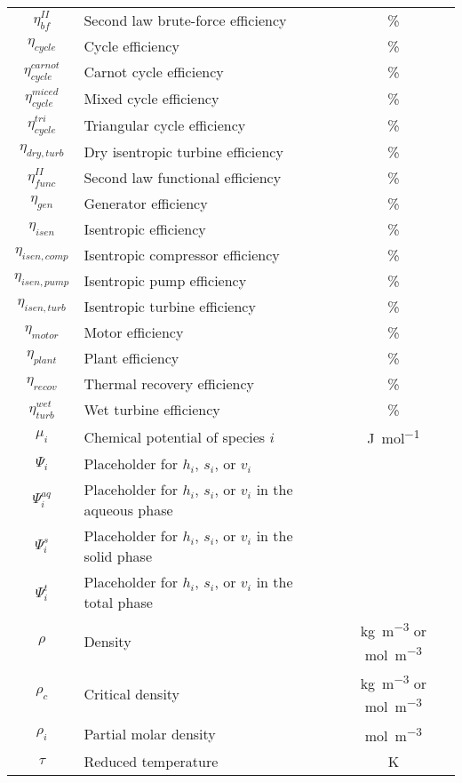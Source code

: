 \begin{longtable}{  c|p{10cm}|c}
        $\eta_{bf}^{II}$ & Second law brute-force efficiency & \unit{\percent} \\[2px]
        $\eta_{cycle}$ & Cycle efficiency & \unit{\percent} \\[2px]
        $\eta_{cycle}^{carnot}$ & Carnot cycle efficiency & \unit{\percent} \\[2px]
        $\eta_{cycle}^{miced}$ & Mixed cycle efficiency & \unit{\percent} \\[2px]
        $\eta_{cycle}^{tri}$ & Triangular cycle efficiency & \unit{\percent} \\[2px]
        $\eta_{dry,turb}$ & Dry isentropic turbine efficiency & \unit{\percent} \\[2px]
        $\eta_{func}^{II}$ & Second law functional efficiency & \unit{\percent} \\[2px]
        $\eta_{gen}$ & Generator efficiency & \unit{\percent} \\[2px]
        $\eta_{isen}$ & Isentropic efficiency & \unit{\percent} \\[2px]
        $\eta_{isen, comp}$ & Isentropic compressor efficiency & \unit{\percent} \\[2px]
        $\eta_{isen, pump}$ & Isentropic pump efficiency & \unit{\percent} \\[2px]
        $\eta_{isen,turb}$ & Isentropic turbine efficiency & \unit{\percent} \\[2px]
        $\eta_{motor}$ & Motor efficiency & \unit{\percent} \\[2px]
        $\eta_{plant}$ & Plant efficiency & \unit{\percent} \\[2px]
        $\eta_{recov}$ & Thermal recovery efficiency & \unit{\percent} \\[2px]
        $\eta_{turb}^{wet}$ & Wet turbine efficiency & \unit{\percent} \\[2px]
        $\mu_i$ & Chemical potential of species \(i\) & \unit{\joule\per\mol} \\[2px]
        $\Psi_i$ & Placeholder for \(h_i\), \(s_i\), or \(v_i\) &  \\[2px]
        $\Psi_i^{aq}$ & Placeholder for \(h_i\), \(s_i\), or \(v_i\) in the aqueous phase &  \\[2px]
        $\Psi_i^{s}$ & Placeholder for \(h_i\), \(s_i\), or \(v_i\) in the solid phase &  \\[2px]
        $\Psi_i^{t}$ & Placeholder for \(h_i\), \(s_i\), or \(v_i\) in the total phase &  \\[2px]
        $\rho$ & Density & \unit{\kg\per\cubic\m} or \unit{\mol\per\cubic\m} \\[2px]
        $\rho_c$ & Critical density & \unit{\kg\per\cubic\m} or \unit{\mol\per\cubic\m} \\[2px]
        $\rho_i$ & Partial molar density & \unit{\mol\per\cubic\m} \\[2px]
        $\tau$ & Reduced temperature & \unit{\K} \\[2px]
    \end{longtable}
    \vspace{1cm}
